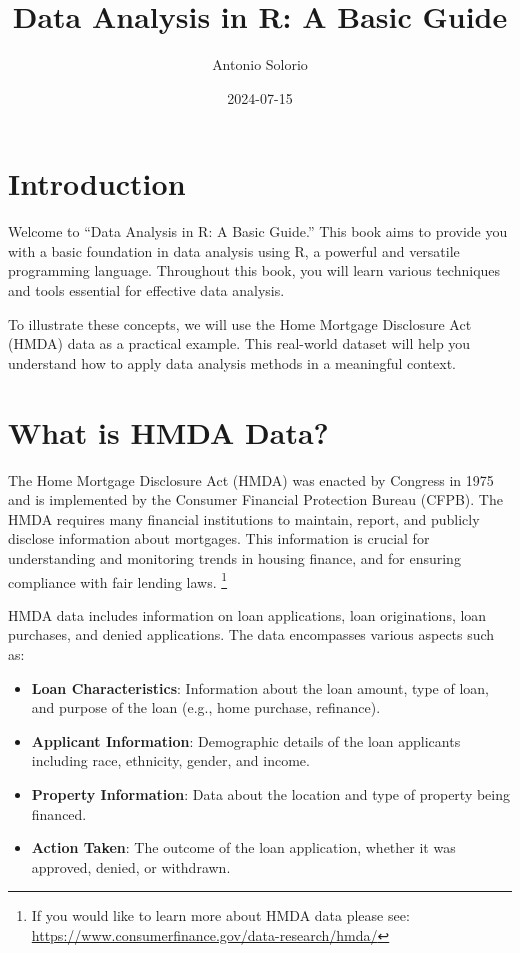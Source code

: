 \documentclass[
]{book}
\title{Data Analysis in R: A Basic Guide}
\author{Antonio Solorio}
\date{2024-07-15}
\providecommand{\tightlist}{%
  \setlength{\itemsep}{0pt}\setlength{\parskip}{0pt}}
\begin{document}
\maketitle

{
\setcounter{tocdepth}{1}
\tableofcontents
}
\hypertarget{introduction}{%
\chapter*{Introduction}\label{introduction}}

Welcome to ``Data Analysis in R: A Basic Guide.'' This book aims to provide you with a basic foundation in data analysis using R, a powerful and versatile programming language. Throughout this book, you will learn various techniques and tools essential for effective data analysis.

To illustrate these concepts, we will use the Home Mortgage Disclosure Act (HMDA) data as a practical example. This real-world dataset will help you understand how to apply data analysis methods in a meaningful context.

\hypertarget{what-is-hmda-data}{%
\chapter{What is HMDA Data?}\label{what-is-hmda-data}}

The Home Mortgage Disclosure Act (HMDA) was enacted by Congress in 1975 and is implemented by the Consumer Financial Protection Bureau (CFPB). The HMDA requires many financial institutions to maintain, report, and publicly disclose information about mortgages. This information is crucial for understanding and monitoring trends in housing finance, and for ensuring compliance with fair lending laws. \footnote{If you would like to learn more about HMDA data please see: \url{https://www.consumerfinance.gov/data-research/hmda/}}

HMDA data includes information on loan applications, loan originations, loan purchases, and denied applications. The data encompasses various aspects such as:

\begin{itemize}
\tightlist
\item
  \textbf{Loan Characteristics}: Information about the loan amount, type of loan, and purpose of the loan (e.g., home purchase, refinance).
\item
  \textbf{Applicant Information}: Demographic details of the loan applicants including race, ethnicity, gender, and income.
\item
  \textbf{Property Information}: Data about the location and type of property being financed.
\item
  \textbf{Action Taken}: The outcome of the loan application, whether it was approved, denied, or withdrawn.
\end{itemize}
\end{document}
